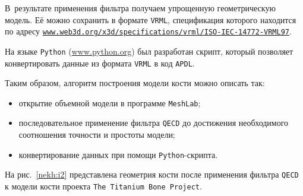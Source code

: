 В~результате применения фильтра получаем упрощенную геометрическую модель. Её можно сохранить в формате {\tt VRML}, спецификация которого находится по адресу \href{http://www.web3d.org/x3d/specifications/vrml/ISO-IEC-14772-VRML97}{\tt www.web3d.org/x3d/specifications/vrml/ISO-IEC-14772-VRML97}. 

На языке {\tt Python} (\href{http://www.python.org}{www.python.org}) был разработан скрипт, который позволяет конвертировать данные из формата {\tt VRML} в код {\tt APDL}.





Таким образом, алгоритм построения модели кости можно описать так:

\begin{itemize}

\item[1)] открытие объемной модели в программе {\tt MeshLab};

\item[2)] последовательное применение фильтра {\tt QECD} до достижения необходимого соотношения точности и простоты модели;

\item[3)] конвертирование данных при помощи {\tt Python}-скрипта.

\end{itemize}





На рис.~\ref{nekh:i2} представлена геометрия кости после применения фильтра {\tt QECD}  к модели кости проекта {\tt The Titanium Bone Project}.

















